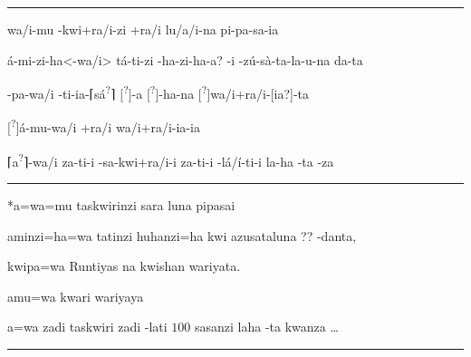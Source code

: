 \vspace{10pt}
\hrule
\vspace{10pt}

\setcounter{parcount}{8}
\begin{parnumbersa}[]

	\raggedright%
	\itshape%

	\lmasc{}wa/i-mu
	\lmasc{}-kwi+ra/i-zi +ra/i
	\lmasc{}lu\logo/a/i-na
	\lmasc{}pi-pa-sa-ia


	\lmasc{}á-mi-zi-ha<-wa/i>
	\lmasc{}tá-ti-zi
	\lbreak{} -ha-zi-ha-a?
	\lmasc{}-i
	-zú-sà-ta-la-u-na
	da-ta


	\lmasc{}-pa-wa/i
	-ti-ia-\textsc{⌈}sá\textsuperscript{?}\textsc{⌉} $[$\lmasc{}\textsuperscript{?}$]$-a
	$[$\lmasc{}\textsuperscript{?}$]$-ha-na
	$[$\lmasc{}\textsuperscript{?}$]$wa/i+ra/i-[ia?]-ta

	$[$\lmasc{}\textsuperscript{?}$]$á-mu-wa/i
	\lmasc{}+ra/i
	\lmasc{}wa/i+ra/i-ia-ia


	\lmasc{}\textsc{⌈}a\textsuperscript{?}\textsc{⌉}-wa/i
	\lmasc{}za-ti-i
	\lmasc{}-sa-kwi+ra/i-i
	\lmasc{}za-ti-i
	\lmasc{}-lá/í-ti-i   la-ha
	-ta
	\lmasc{}-za


\end{parnumbersa}

\vspace{10pt}
\hrule
\vspace{10pt}


\setcounter{parcount}{8}
\begin{parnumbersa}[]

	\raggedright%
	\itshape%

	*a=wa=mu taskwirinzi sara luna pipasai

	aminzi=ha=wa tatinzi huhanzi=ha kwi azusataluna {??}
	-danta,

	kwipa=wa Runtiyas na kwishan wariyata.

	amu=wa kwari wariyaya

	a=wa zadi taskwiri zadi -lati $100$ sasanzi laha -ta kwanza \ldots{}

\end{parnumbersa}

\vspace{10pt}
\hrule


